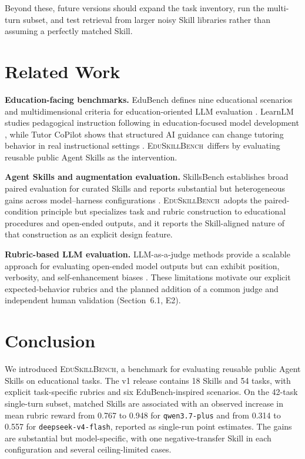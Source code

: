 \documentclass[10pt]{article}
\newcommand{\bench}{\textsc{EduSkillBench}\xspace}
\begin{document}
Beyond these, future versions should expand the task inventory, run the multi-turn subset, and test retrieval from larger noisy Skill libraries rather than assuming a perfectly matched Skill.

\section{Related Work}

\textbf{Education-facing benchmarks.}
EduBench defines nine educational scenarios and multidimensional criteria for education-oriented LLM evaluation \cite{edubench}. LearnLM studies pedagogical instruction following in education-focused model development \cite{learnlm}, while Tutor CoPilot shows that structured AI guidance can change tutoring behavior in real instructional settings \cite{tutorcopilot}. \bench~differs by evaluating reusable public Agent Skills as the intervention.

\textbf{Agent Skills and augmentation evaluation.}
SkillsBench establishes broad paired evaluation for curated Skills and reports substantial but heterogeneous gains across model--harness configurations \cite{skillsbench}. \bench~adopts the paired-condition principle but specializes task and rubric construction to educational procedures and open-ended outputs, and it reports the Skill-aligned nature of that construction as an explicit design feature.

\textbf{Rubric-based LLM evaluation.}
LLM-as-a-judge methods provide a scalable approach for evaluating open-ended model outputs but can exhibit position, verbosity, and self-enhancement biases \cite{llmjudge}. These limitations motivate our explicit expected-behavior rubrics and the planned addition of a common judge and independent human validation (Section~6.1, E2).

\section{Conclusion}

We introduced \bench, a benchmark for evaluating reusable public Agent Skills on educational tasks. The v1 release contains 18 Skills and 54 tasks, with explicit task-specific rubrics and six EduBench-inspired scenarios. On the 42-task single-turn subset, matched Skills are associated with an observed increase in mean rubric reward from 0.767 to 0.948 for \texttt{qwen3.7-plus} and from 0.314 to 0.557 for \texttt{deepseek-v4-flash}, reported as single-run point estimates. The gains are substantial but model-specific, with one negative-transfer Skill in each configuration and several ceiling-limited cases.
\end{document}
